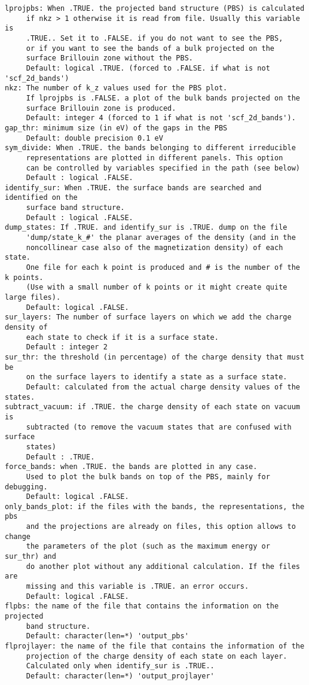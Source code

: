 \documentclass[12pt,a4paper]{article}
\begin{document}
\begin{verbatim}
lprojpbs: When .TRUE. the projected band structure (PBS) is calculated 
     if nkz > 1 otherwise it is read from file. Usually this variable is
     .TRUE.. Set it to .FALSE. if you do not want to see the PBS, 
     or if you want to see the bands of a bulk projected on the 
     surface Brillouin zone without the PBS.
     Default: logical .TRUE. (forced to .FALSE. if what is not 'scf_2d_bands')
nkz: The number of k_z values used for the PBS plot. 
     If lprojpbs is .FALSE. a plot of the bulk bands projected on the 
     surface Brillouin zone is produced.
     Default: integer 4 (forced to 1 if what is not 'scf_2d_bands').
gap_thr: minimum size (in eV) of the gaps in the PBS
     Default: double precision 0.1 eV
sym_divide: When .TRUE. the bands belonging to different irreducible 
     representations are plotted in different panels. This option
     can be controlled by variables specified in the path (see below)
     Default : logical .FALSE.
identify_sur: When .TRUE. the surface bands are searched and identified on the
     surface band structure. 
     Default : logical .FALSE.
dump_states: If .TRUE. and identify_sur is .TRUE. dump on the file 
     'dump/state_k_#' the planar averages of the density (and in the 
     noncollinear case also of the magnetization density) of each state. 
     One file for each k point is produced and # is the number of the k points.
     (Use with a small number of k points or it might create quite large files).
     Default: logical .FALSE.
sur_layers: The number of surface layers on which we add the charge density of 
     each state to check if it is a surface state.
     Default : integer 2
sur_thr: the threshold (in percentage) of the charge density that must be
     on the surface layers to identify a state as a surface state.
     Default: calculated from the actual charge density values of the states.
subtract_vacuum: if .TRUE. the charge density of each state on vacuum is
     subtracted (to remove the vacuum states that are confused with surface
     states)
     Default : .TRUE.
force_bands: when .TRUE. the bands are plotted in any case.
     Used to plot the bulk bands on top of the PBS, mainly for debugging.
     Default: logical .FALSE.
only_bands_plot: if the files with the bands, the representations, the pbs
     and the projections are already on files, this option allows to change
     the parameters of the plot (such as the maximum energy or sur_thr) and
     do another plot without any additional calculation. If the files are
     missing and this variable is .TRUE. an error occurs.
     Default: logical .FALSE.
flpbs: the name of the file that contains the information on the projected
     band structure.
     Default: character(len=*) 'output_pbs'
flprojlayer: the name of the file that contains the information of the
     projection of the charge density of each state on each layer.
     Calculated only when identify_sur is .TRUE..
     Default: character(len=*) 'output_projlayer'
\end{verbatim}
\end{document}
